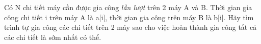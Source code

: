 Có N chi tiết máy cần được gia công   \textit{    lần lượt   }   trên 2 máy A và B. Thời gian gia công chi tiết i trên máy A là a[i], thời gian gia công trên máy B là b[i]. Hãy tìm trình tự gia công các chi tiết trên 2 máy sao cho việc hoàn thành gia công tất cả các chi tiết là sớm nhất có thể.